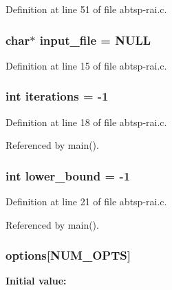 Definition at line 51 of file abtsp-rai.c.\hypertarget{abtsp-rai_8c_a4f3a15de34c409bdec6ceacf93078ed}{
\subsubsection[{input\_\-file}]{\setlength{\rightskip}{0pt plus 5cm}char$\ast$ {\bf input\_\-file} = NULL}}
\label{abtsp-rai_8c_a4f3a15de34c409bdec6ceacf93078ed}




Definition at line 15 of file abtsp-rai.c.\hypertarget{abtsp-rai_8c_1d10e252e778731e59f0f71afd7e727e}{
\subsubsection[{iterations}]{\setlength{\rightskip}{0pt plus 5cm}int {\bf iterations} = -1}}
\label{abtsp-rai_8c_1d10e252e778731e59f0f71afd7e727e}




Definition at line 18 of file abtsp-rai.c.

Referenced by main().\hypertarget{abtsp-rai_8c_ed7394fd8e0c2796b26b9654fd10fd9d}{
\subsubsection[{lower\_\-bound}]{\setlength{\rightskip}{0pt plus 5cm}int {\bf lower\_\-bound} = -1}}
\label{abtsp-rai_8c_ed7394fd8e0c2796b26b9654fd10fd9d}




Definition at line 21 of file abtsp-rai.c.

Referenced by main().\hypertarget{abtsp-rai_8c_cea6a9709d519c143f30db401a0d0c72}{
\subsubsection[{options}]{ {\bf options}\mbox{[}NUM\_\-OPTS\mbox{]}}}
\label{abtsp-rai_8c_cea6a9709d519c143f30db401a0d0c72}


\textbf{Initial value:}


